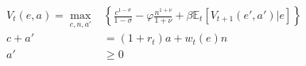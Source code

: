 \begin{align}
    V_t(e, a) = \max_{c, n, a'} & \left\{\frac{c^{1-\sigma}}{1-\sigma} - \varphi \frac{n^{1+\nu}}{1+\nu} + \beta \mathbb{E}_t\left[V_{t+1}(e', a')|e\right] \right\}
    \\
    c + a'                      & = (1 + r_t)a + w_t(e) n
    \\
    a'                          & \geq 0
\end{align}

